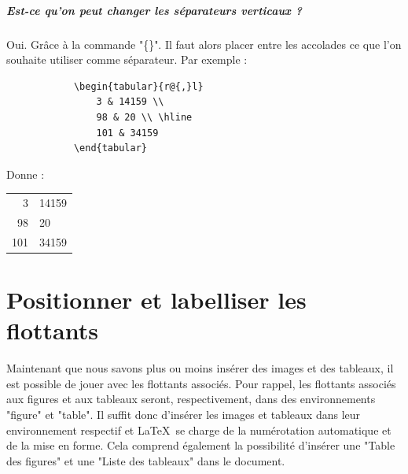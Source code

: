 \documentclass[a4paper, 13pt]{report} %
\begin{document}
		\paragraph{Est-ce qu'on peut changer les séparateurs verticaux ?\\}
			Oui. Grâce à la commande "\@\{\}". Il faut alors placer entre les accolades ce que l'on souhaite utiliser comme séparateur. Par exemple :\vspace{1em}\\
			\begin{minipage}[c]{.3\textwidth}
			\begin{flushright}
			\begin{verbatim}
			\begin{tabular}{r@{,}l}
				3 & 14159 \\
				98 & 20 \\ \hline
				101 & 34159
			\end{tabular}
			\end{verbatim}
			\end{flushright}
			\end{minipage}
			\begin{minipage}[c]{.59\textwidth}
			Donne :
			\begin{tabular}{r@{,}l}
				3 & 14159 \\
				98 & 20 \\ \hline
				101 & 34159
			\end{tabular}
			\end{minipage}

	\chapter{Positionner et labelliser les flottants}
		Maintenant que nous savons plus ou moins insérer des images et des tableaux, il est possible de jouer avec les flottants associés. Pour rappel, les flottants associés aux figures et aux tableaux seront, respectivement, dans des environnements "figure" et "table". Il suffit donc d'insérer les images et tableaux dans leur environnement respectif et \LaTeX\ se charge de la numérotation automatique et de la mise en forme. Cela comprend également la possibilité d'insérer une "Table des figures" et une "Liste des tableaux" dans le document.
\end{document}
